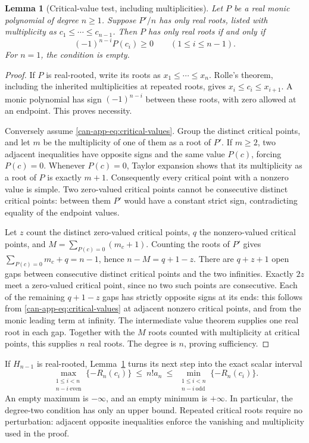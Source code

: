 \documentclass[11pt,a4paper]{article}
\numberwithin{equation}{section}
\newtheorem{lemma}[theorem]{Lemma}
\theoremstyle{definition}
\theoremstyle{remark}
\begin{document}
\begin{lemma}[Critical-value test, including multiplicities]
\label{can-app-lem:critical-values}
Let $P$ be a real monic polynomial of degree $n\geq1$. Suppose $P'/n$
has only real roots, listed with multiplicity as
$c_1\leq\cdots\leq c_{n-1}$. Then $P$ has only real roots if and only if
\begin{equation}\label{can-app-eq:critical-values}
 (-1)^{n-i}P(c_i)\geq0\qquad(1\leq i\leq n-1).
\end{equation}
For $n=1$, the condition is empty.
\end{lemma}
\begin{proof}
If $P$ is real-rooted, write its roots as $x_1\leq\cdots\leq x_n$.
Rolle's theorem, including the inherited multiplicities at repeated roots,
gives $x_i\leq c_i\leq x_{i+1}$. A monic polynomial has sign
$(-1)^{n-i}$ between these roots, with zero allowed at an endpoint.
This proves necessity.

Conversely assume \eqref{can-app-eq:critical-values}. Group the distinct
critical points, and let $m$ be the multiplicity of one of them as a
root of $P'$. If $m\geq2$, two adjacent inequalities have opposite
signs and the same value $P(c)$, forcing $P(c)=0$. Whenever $P(c)=0$,
Taylor expansion shows that its multiplicity as a root of $P$ is
exactly $m+1$. Consequently every critical point with a nonzero value
is simple. Two zero-valued critical points cannot be consecutive
distinct critical points: between them $P'$ would have a constant
strict sign, contradicting equality of the endpoint values.

Let $z$ count the distinct zero-valued critical points, $q$ the
nonzero-valued critical points, and
$M=\sum_{P(c)=0}(m_c+1)$. Counting the roots of $P'$ gives
$\sum_{P(c)=0}m_c+q=n-1$, hence $n-M=q+1-z$.
There are $q+z+1$ open gaps between consecutive distinct critical
points and the two infinities. Exactly $2z$ meet a zero-valued
critical point, since no two such points are consecutive. Each of
the remaining $q+1-z$ gaps has strictly opposite signs at its ends:
this follows from \eqref{can-app-eq:critical-values} at adjacent
nonzero critical points, and from the monic leading term at infinity.
The intermediate value theorem supplies one real root in each gap.
Together with the $M$ roots counted with multiplicity at critical
points, this supplies $n$ real roots. The degree is $n$, proving
sufficiency.
\end{proof}

If $H_{n-1}$ is real-rooted, Lemma~\ref{can-app-lem:critical-values}
turns its next step into the exact scalar interval
\begin{equation}\label{can-app-eq:constant-interval}
 \max_{\substack{1\leq i<n\\ n-i\ \text{even}}}
       \{-R_n(c_i)\}
 \ \leq\ n!a_n\ \leq\
 \min_{\substack{1\leq i<n\\ n-i\ \text{odd}}}
       \{-R_n(c_i)\}.
\end{equation}
An empty maximum is $-\infty$, and an empty minimum is $+\infty$.
In particular, the degree-two condition has only an upper bound.
Repeated critical roots require no perturbation: adjacent opposite
inequalities enforce the vanishing and multiplicity used in the proof.
\end{document}
